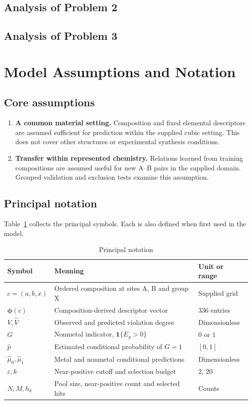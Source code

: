\subsection{Analysis of Problem 2}
\subsection{Analysis of Problem 3}

\section{Model Assumptions and Notation}
\subsection{Core assumptions}
\begin{enumerate}
  \item \textbf{A common material setting.} Composition and fixed elemental descriptors are assumed sufficient for prediction within the supplied cubic setting. This does not cover other structures or experimental synthesis conditions.
  \item \textbf{Transfer within represented chemistry.} Relations learned from training compositions are assumed useful for new A--B pairs in the supplied domain. Grouped validation and exclusion tests examine this assumption.
\end{enumerate}

\subsection{Principal notation}
Table~\ref{tab:notation} collects the principal symbols. Each is also defined when first used in the model.
\par
\begin{table}[H]
\centering
\caption{Principal notation}\label{tab:notation}
\begin{tabularx}{\linewidth}{@{}l X l@{}}
\toprule
Symbol & Meaning & Unit or range\\
\midrule
$c=(a,b,x)$ & Ordered composition at sites A, B and group X & Supplied grid\\
$\boldsymbol\phi(c)$ & Composition-derived descriptor vector & 336 entries\\
$V,\widehat V$ & Observed and predicted violation degree & Dimensionless\\
$G$ & Nonmetal indicator, $\mathbf{1}\{E_g>0\}$ & $0$ or $1$\\
$\widehat p$ & Estimated conditional probability of $G=1$ & $[0,1]$\\
$\widehat\mu_0,\widehat\mu_1$ & Metal and nonmetal conditional predictions & Dimensionless\\
$\varepsilon,k$ & Near-positive cutoff and selection budget & $2$, $20$\\
$N,M,h_k$ & Pool size, near-positive count and selected hits & Counts\\
\bottomrule
\end{tabularx}
\end{table}
\par
\FloatBarrier
